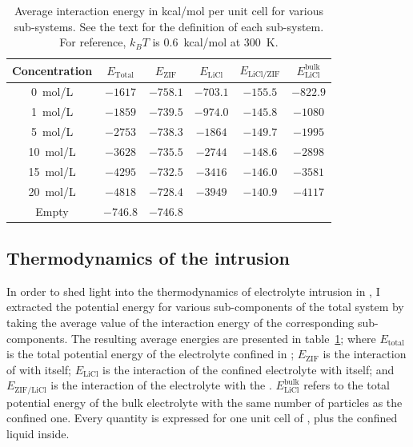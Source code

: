 \documentclass[thesis]{subfiles}
\begin{document}
\begin{table}[t]
    \caption{Average interaction energy in kcal/mol per unit cell for various
    sub-systems. See the text for the definition of each sub-system.
    For reference, $k_BT$ is \SI{0.6}{kcal/mol} at \SI{300}{K}.}
    \label{table:thermo:raw}
    \centering
    \renewcommand{\arraystretch}{1.1}
    \begin{tabular}{c c c c c c}
        \toprule
        Concentration  & $E_\text{Total}$ & $E_\text{ZIF}$ & $E_\text{LiCl}$ & $E_\text{LiCl/ZIF}$ & $E_\text{LiCl}^\text{bulk}$ \\
        \midrule
        \SI{0}{mol/L}  &     $-1617$        &    $-758.1$      &   $-703.1$        &     $-155.5$           &   $-822.9$    \\
        \SI{1}{mol/L}  &     $-1859$        &    $-739.5$      &   $-974.0$        &     $-145.8$          &   $-1080$     \\
        \SI{5}{mol/L}  &     $-2753$        &    $-738.3$      &   $-1864$         &     $-149.7$           &   $-1995$     \\
        \SI{10}{mol/L} &     $-3628$        &    $-735.5$      &   $-2744$         &     $-148.6$           &   $-2898$     \\
        \SI{15}{mol/L} &     $-4295$        &    $-732.5$      &   $-3416$         &     $-146.0$           &   $-3581$     \\
        \SI{20}{mol/L} &     $-4818$        &    $-728.4$      &   $-3949$         &     $-140.9$           &   $-4117$     \\
        \bottomrule
        Empty          &     $-746.8$       &    $-746.8$      &                 &                      &             \\
        \bottomrule
    \end{tabular}
\end{table}
\subsection{Thermodynamics of the intrusion}

In order to shed light into the thermodynamics of electrolyte intrusion in
, I extracted the potential energy for various sub-components of the total
system by taking the average value of the interaction energy of the
corresponding sub-components. The resulting average energies are presented in
table~\ref{table:thermo:raw}; where $E_\text{total}$ is the total potential
energy of the electrolyte confined in ; $E_\text{ZIF}$ is the interaction
of  with itself; $E_\text{LiCl}$ is the interaction of the confined
electrolyte with itself; and $E_\text{ZIF/LiCl}$ is the interaction of the
electrolyte with the . $E_\text{LiCl}^\text{bulk}$ refers to the total
potential energy of the bulk electrolyte with the same number of particles as
the confined one. Every quantity is expressed for one unit cell of , plus
the confined liquid inside.
\end{document}
